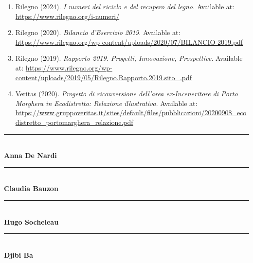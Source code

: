 \documentclass[10pt,a4paper]{article}
\begin{document}
\begin{enumerate}
    \item Rilegno (2024). \textit{I numeri del riciclo e del recupero del legno.} Available at: \url{https://www.rilegno.org/i-numeri/}
    \item Rilegno (2020). \textit{Bilancio d'Esercizio 2019}. Available at: \url{https://www.rilegno.org/wp-content/uploads/2020/07/BILANCIO-2019.pdf}
    \item Rilegno (2019). \textit{Rapporto 2019. Progetti, Innovazione, Prospettive}. Available at: \url{https://www.rilegno.org/wp-content/uploads/2019/05/Rilegno.Rapporto.2019.sito_.pdf}
    \item Veritas (2020). \textit{Progetto di riconversione dell’area ex-Inceneritore di Porto Marghera in Ecodistretto: Relazione illustrativa}. Available at: \url{https://www.gruppoveritas.it/sites/default/files/pubblicazioni/20200908_ecodistretto_portomarghera_relazione.pdf}
\end{enumerate}
\vspace{2cm}

\noindent
\begin{minipage}[t]{0.22\textwidth}
    \centering
    \rule{\textwidth}{0.4pt}\\
    {\color{sapienza} \textbf{Anna De Nardi}} \\
\end{minipage}\hfill
\begin{minipage}[t]{0.22\textwidth}
    \centering
    \rule{\textwidth}{0.4pt}\\
    {\color{sapienza} \textbf{Claudia Bauzon}} \\
\end{minipage}\hfill
\begin{minipage}[t]{0.22\textwidth}
    \centering
    \rule{\textwidth}{0.4pt}\\
    {\color{sapienza} \textbf{Hugo Socheleau}} \\
\end{minipage}\hfill
\begin{minipage}[t]{0.22\textwidth}
    \centering
    \rule{\textwidth}{0.4pt}\\
    {\color{sapienza} \textbf{Djibi Ba}} \\
\end{minipage}

	
\end{document}
